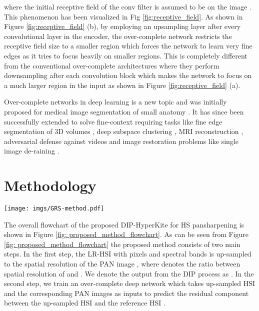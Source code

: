 \documentclass[journal]{IEEEtran}
\begin{document}
 where the initial receptive field of the conv filter is assumed to be  on the image . This phenomenon has been visualized in Fig \ref{fig:receptive_field}. As shown in Figure \ref{fig:receptive_field} (b), by employing an upsampling layer after every convolutional layer in the encoder, the over-complete network restricts the receptive field size to a smaller region which forces the network to learn very fine edges as it tries to focus heavily on smaller regions. This is completely different from the conventional over-complete architectures where they perform downsampling after each convolution block which makes the network to focus on a much larger region in the input as shown in Figure \ref{fig:receptive_field} (a).
 \par Over-complete networks in deep learning is a new topic and was initially proposed for  medical image segmentation of small anatomy \cite{valanarasu2020kiu}. It has since been successfully extended to solve fine-context requiring tasks like fine edge segmentation of 3D volumes \cite{valanarasu2020kiu2}, deep subspace clustering \cite{valanarasu2021overcomplete}, MRI reconstruction \cite{guo2021overandunder}, adversarial defense against videos \cite{lo2020overcomplete} and image restoration problems like single image de-raining \cite{yasarla2020exploring}.

\section{Methodology}
\label{sec: method}
\label{proposed_method}
\begin{figure*}[tb!]
        \centering
        \texttt{[image: imgs/GRS-method.pdf]}
        \caption{The overall flowchart of our proposed DIP-HyperKite for HS pansharpening. In the first step, we up-sample the LR-HSI  via DIP process to obtain the up-sampled HSI . The DIP process takes a fixed noise tensor  as input for a given LR-HSI , and produces the up-sampled HSI  by optimizing the proposed spatial+spectral energy function  over the DIP network parameters . In the second step, we take the up-sampled HSI  and the PAN image  as inputs to predict the residual component  using our proposed over-complete network - HyperKite. Finally, the predicted residual image  is added to the up-sampled HSI  to obtain the pansharpened HSI .} 
        \label{fig: proposed_method_flowchart}
    \end{figure*}
    \par The overall flowchart of the proposed DIP-HyperKite for HS pansharpening is shown in Figure \ref{fig: proposed_method_flowchart}. As can be seen from Figure \ref{fig: proposed_method_flowchart} the proposed method consists of two main steps. In the first step, the LR-HSI  with  pixels and  spectral bands is up-sampled to the spatial resolution of the PAN image , where  denotes the ratio between spatial resolution of  and . We denote the output from the DIP process as . In the second step, we train an over-complete deep network which takes up-sampled HSI  and the corresponding PAN images  as inputs to predict the residual component  between the up-sampled HSI  and the reference HSI . 
\end{document}
